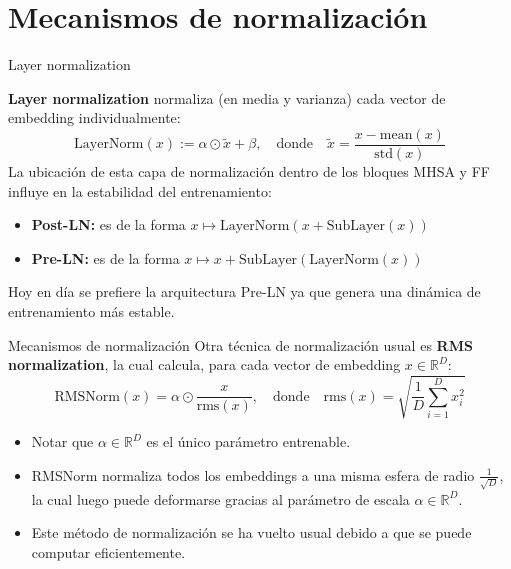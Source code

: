 \documentclass{beamer}
\newcommand{\R}{\mathbb{R}}
\begin{document}
\section{Mecanismos de normalización}
\begin{frame}{Layer normalization}

    \textbf{Layer normalization} normaliza (en media y varianza) cada vector de embedding individualmente:
    \begin{equation*}
        \text{LayerNorm}(x) := \alpha \odot \tilde{x} + \beta,
        \quad\text{donde}\quad
        \tilde{x} = \frac{x - \text{mean}(x)}{\text{std}(x)}
    \end{equation*}
    La ubicación de esta capa de normalización dentro de los bloques MHSA y FF influye en la estabilidad del entrenamiento:
    \vspace{-0.5cm}
    \begin{itemize}
        \item \textbf{Post-LN:} es de la forma $x\mapsto\text{LayerNorm}(x+\text{SubLayer}(x))$
        \item \textbf{Pre-LN:} es de la forma $x\mapsto x+\text{SubLayer}(\text{LayerNorm}(x))$
    \end{itemize}
    Hoy en día se prefiere la arquitectura Pre-LN ya que genera una dinámica de entrenamiento más estable.
\end{frame}

\begin{frame}{Mecanismos de normalización}
    Otra técnica de normalización usual es \textbf{RMS normalization}, la cual calcula, para cada vector de embedding $x\in\R^D$:
    \begin{equation*}
        \text{RMSNorm}(x) = \alpha \odot \frac{x}{\text{rms}(x)},
        \quad\text{donde}\quad
        \text{rms}(x) = \sqrt{\frac{1}{D}\sum_{i=1}^{D} x_i^2}
    \end{equation*}
    \vspace{-0.5cm}
    \begin{itemize}
        \item Notar que $ \alpha \in \mathbb{R}^{D} $ es el único parámetro entrenable.
        \item RMSNorm normaliza todos los embeddings a una misma esfera de radio $\frac{1}{\sqrt{D}}$, la cual luego puede deformarse gracias al parámetro de escala $\alpha\in\R^D$.
        \item Este método de normalización se ha vuelto usual debido a que se puede computar eficientemente.
    \end{itemize}
\end{frame}
\end{document}

